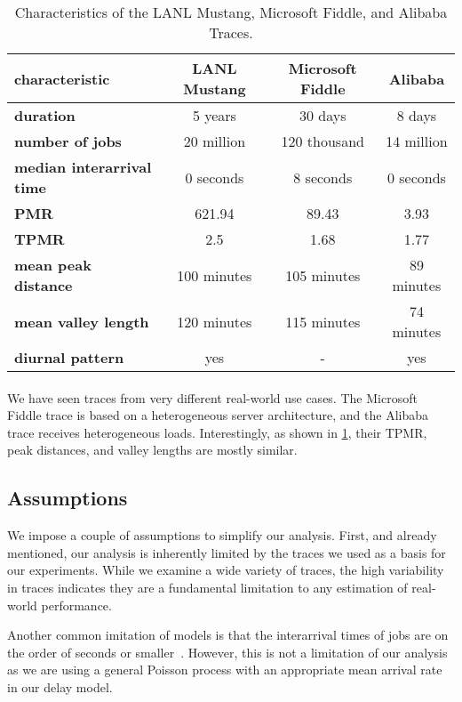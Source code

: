 \begin{table}
    \centering
    \begin{tabular}{>{\bfseries\centering}l|c|c|c}
        characteristic & LANL Mustang & Microsoft Fiddle & Alibaba \\\hline
        duration & 5 years & 30 days & 8 days \\
        number of jobs & 20 million & 120 thousand & 14 million \\
        median interarrival time & 0 seconds & 8 seconds & 0 seconds \\
        PMR & 621.94 & 89.43 & 3.93 \\
        TPMR & 2.5 & 1.68 & 1.77 \\
        mean peak distance & 100 minutes & 105 minutes & 89 minutes \\
        mean valley length & 120 minutes & 115 minutes & 74 minutes \\
        diurnal pattern & yes & - & yes \\
    \end{tabular}
    \caption{Characteristics of the LANL Mustang, Microsoft Fiddle, and Alibaba Traces.}
    \label{tab:traces}
\end{table}

\paragraph{} We have seen traces from very different real-world use cases. The Microsoft Fiddle trace is based on a heterogeneous server architecture, and the Alibaba trace receives heterogeneous loads. Interestingly, as shown in \cref{tab:traces}, their TPMR, peak distances, and valley lengths are mostly similar.

\subsection{Assumptions}

We impose a couple of assumptions to simplify our analysis. First, and already mentioned, our analysis is inherently limited by the traces we used as a basis for our experiments. While we examine a wide variety of traces, the high variability in traces indicates they are a fundamental limitation to any estimation of real-world performance.

Another common imitation of models is that the interarrival times of jobs are on the order of seconds or smaller~\cite{Amvrosiadis2018}. However, this is not a limitation of our analysis as we are using a general Poisson process with an appropriate mean arrival rate in our delay model.

